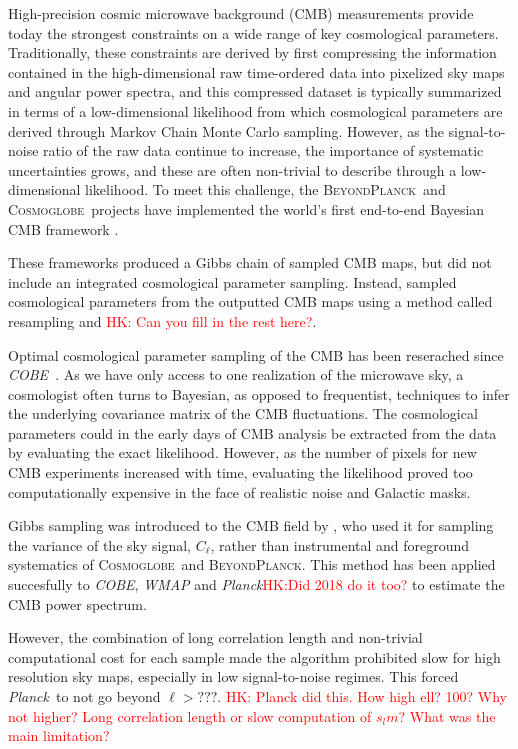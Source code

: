 \documentclass[twocolumn]{../common/aa}
\def\WMAP{\emph{WMAP}}
\def\COBE{\emph{COBE}}
\def\Planck{\emph{Planck}}
\newcommand{\BP}{\textsc{BeyondPlanck}}
\newcommand{\cosmoglobe}{\textsc{Cosmoglobe}}
\begin{document}
  High-precision cosmic microwave background (CMB) measurements provide today the strongest constraints on a wide range of key cosmological parameters. Traditionally, these constraints are derived by first compressing the information contained in the high-dimensional raw time-ordered data into pixelized sky maps and angular power spectra, and this compressed dataset is typically summarized in terms of a low-dimensional likelihood from which cosmological parameters are derived through Markov Chain Monte Carlo sampling. However, as the signal-to-noise ratio of the raw data continue to increase, the importance of systematic uncertainties grows, and these are often non-trivial to describe through a low-dimensional likelihood. To meet this challenge, the \BP\ and \cosmoglobe\ projects have implemented the world's first end-to-end Bayesian CMB framework \citep{bp01, watts2023_dr1}.

  These frameworks produced a Gibbs chain of sampled CMB maps, but did not include an integrated cosmological parameter sampling.  Instead, \citet{bp12} sampled cosmological parameters from the outputted CMB maps using a method called resampling and \textcolor{red}{HK: Can you fill in the rest here?}.

Optimal cosmological parameter sampling of the CMB has been reserached since \COBE\ \citep{smoot1995}. As we have only access to one realization of the microwave sky, a cosmologist often turns to Bayesian, as opposed to frequentist, techniques to infer the underlying covariance matrix of the CMB fluctuations. The cosmological parameters could in the early days of CMB analysis be extracted from the data by evaluating the exact likelihood. However, as the number of pixels for new CMB experiments increased with time, evaluating the likelihood proved too computationally expensive in the face of realistic noise and Galactic masks.

Gibbs sampling was introduced to the CMB field by \citet{jewell2004}, who used it for sampling the variance of the sky signal, $C_{\ell}$, rather than instrumental and foreground systematics of \cosmoglobe\ and \BP. This method has been applied succesfully to \COBE\citep{wandelt2004}, \WMAP\citep{Eriksen:2007jw} and \Planck\citep{planck2014-a13}\textcolor{red}{HK:Did 2018 do it too?} to estimate the CMB power spectrum.

However, the combination of long correlation length and non-trivial computational cost for each sample made the algorithm prohibited slow for high resolution sky maps, especially in low signal-to-noise regimes. This forced \Planck\ to not go beyond $\ell > ???$. \textcolor{red}{HK: Planck did this. How high ell? 100? Why not higher? Long correlation length or slow computation of $s_lm$? What was the main limitation?}
\end{document}
